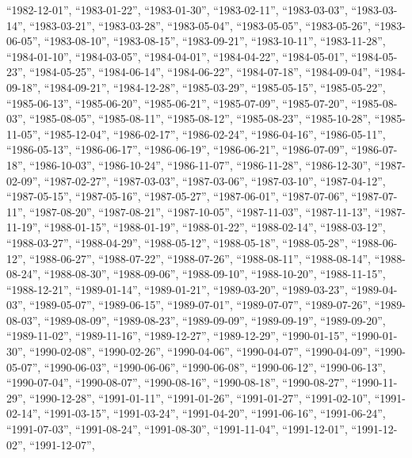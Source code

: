 \documentclass[
  letterpaper,
  DIV=11,
  numbers=noendperiod]{scrartcl}
\begin{document}
\begin{itemize}
  ``1982-12-01'', ``1983-01-22'', ``1983-01-30'', ``1983-02-11'',
  ``1983-03-03'', ``1983-03-14'', ``1983-03-21'', ``1983-03-28'',
  ``1983-05-04'', ``1983-05-05'', ``1983-05-26'', ``1983-06-05'',
  ``1983-08-10'', ``1983-08-15'', ``1983-09-21'', ``1983-10-11'',
  ``1983-11-28'', ``1984-01-10'', ``1984-03-05'', ``1984-04-01'',
  ``1984-04-22'', ``1984-05-01'', ``1984-05-23'', ``1984-05-25'',
  ``1984-06-14'', ``1984-06-22'', ``1984-07-18'', ``1984-09-04'',
  ``1984-09-18'', ``1984-09-21'', ``1984-12-28'', ``1985-03-29'',
  ``1985-05-15'', ``1985-05-22'', ``1985-06-13'', ``1985-06-20'',
  ``1985-06-21'', ``1985-07-09'', ``1985-07-20'', ``1985-08-03'',
  ``1985-08-05'', ``1985-08-11'', ``1985-08-12'', ``1985-08-23'',
  ``1985-10-28'', ``1985-11-05'', ``1985-12-04'', ``1986-02-17'',
  ``1986-02-24'', ``1986-04-16'', ``1986-05-11'', ``1986-05-13'',
  ``1986-06-17'', ``1986-06-19'', ``1986-06-21'', ``1986-07-09'',
  ``1986-07-18'', ``1986-10-03'', ``1986-10-24'', ``1986-11-07'',
  ``1986-11-28'', ``1986-12-30'', ``1987-02-09'', ``1987-02-27'',
  ``1987-03-03'', ``1987-03-06'', ``1987-03-10'', ``1987-04-12'',
  ``1987-05-15'', ``1987-05-16'', ``1987-05-27'', ``1987-06-01'',
  ``1987-07-06'', ``1987-07-11'', ``1987-08-20'', ``1987-08-21'',
  ``1987-10-05'', ``1987-11-03'', ``1987-11-13'', ``1987-11-19'',
  ``1988-01-15'', ``1988-01-19'', ``1988-01-22'', ``1988-02-14'',
  ``1988-03-12'', ``1988-03-27'', ``1988-04-29'', ``1988-05-12'',
  ``1988-05-18'', ``1988-05-28'', ``1988-06-12'', ``1988-06-27'',
  ``1988-07-22'', ``1988-07-26'', ``1988-08-11'', ``1988-08-14'',
  ``1988-08-24'', ``1988-08-30'', ``1988-09-06'', ``1988-09-10'',
  ``1988-10-20'', ``1988-11-15'', ``1988-12-21'', ``1989-01-14'',
  ``1989-01-21'', ``1989-03-20'', ``1989-03-23'', ``1989-04-03'',
  ``1989-05-07'', ``1989-06-15'', ``1989-07-01'', ``1989-07-07'',
  ``1989-07-26'', ``1989-08-03'', ``1989-08-09'', ``1989-08-23'',
  ``1989-09-09'', ``1989-09-19'', ``1989-09-20'', ``1989-11-02'',
  ``1989-11-16'', ``1989-12-27'', ``1989-12-29'', ``1990-01-15'',
  ``1990-01-30'', ``1990-02-08'', ``1990-02-26'', ``1990-04-06'',
  ``1990-04-07'', ``1990-04-09'', ``1990-05-07'', ``1990-06-03'',
  ``1990-06-06'', ``1990-06-08'', ``1990-06-12'', ``1990-06-13'',
  ``1990-07-04'', ``1990-08-07'', ``1990-08-16'', ``1990-08-18'',
  ``1990-08-27'', ``1990-11-29'', ``1990-12-28'', ``1991-01-11'',
  ``1991-01-26'', ``1991-01-27'', ``1991-02-10'', ``1991-02-14'',
  ``1991-03-15'', ``1991-03-24'', ``1991-04-20'', ``1991-06-16'',
  ``1991-06-24'', ``1991-07-03'', ``1991-08-24'', ``1991-08-30'',
  ``1991-11-04'', ``1991-12-01'', ``1991-12-02'', ``1991-12-07'',

\end{itemize}
\end{document}
